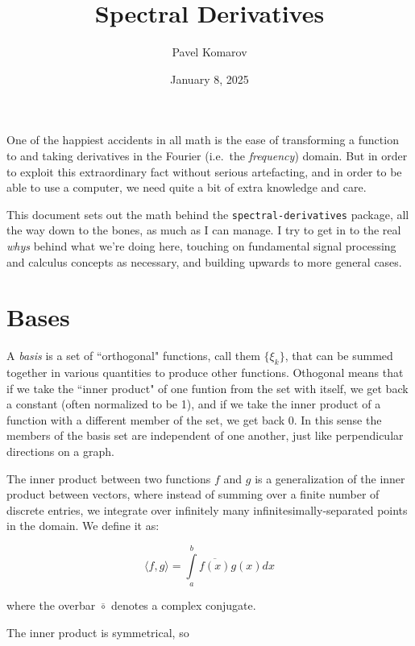 \documentclass[10pt]{article}
\begin{document}
\allowdisplaybreaks

\title{Spectral Derivatives}
\author{Pavel Komarov}
\date{January 8, 2025}
\maketitle

One of the happiest accidents in all math is the ease of transforming a function to and taking derivatives in the Fourier (i.e.~the \textit{frequency}) domain. But in order to exploit this extraordinary fact without serious artefacting, and in order to be able to use a computer, we need quite a bit of extra knowledge and care.

This document sets out the math behind the \texttt{spectral-derivatives} package, all the way down to the bones, as much as I can manage. I try to get in to the real \textit{whys} behind what we're doing here, touching on fundamental signal processing and calculus concepts as necessary, and building upwards to more general cases.

\small
\tableofcontents
\normalsize

\section{Bases}

A \textit{basis} is a set of ``orthogonal" functions, call them $\{\xi_k\}$, that can be summed together in various quantities to produce other functions. Othogonal means that if we take the ``inner product" of one funtion from the set with itself, we get back a constant (often normalized to be 1), and if we take the inner product of a function with a different member of the set, we get back 0. In this sense the members of the basis set are independent of one another, just like perpendicular directions on a graph.

The inner product between two functions $f$ and $g$ is a generalization of the inner product between vectors, where instead of summing over a finite number of discrete entries, we integrate over infinitely many infinitesimally-separated points in the domain. We define it as:

$$ \langle f,g \rangle = \int\limits_{a}^{b} \overline{f(x)} g(x) dx $$

where the overbar $\overline{\circ}$ denotes a complex conjugate.\newline

The inner product is symmetrical, so
\end{document}

